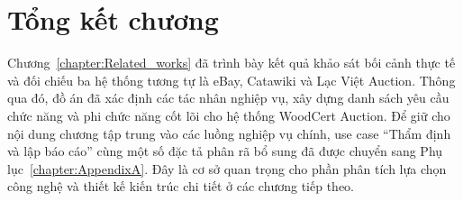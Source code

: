 \documentclass[../DoAn.tex]{subfiles}
\begin{document}
\section{Tổng kết chương}

Chương~\ref{chapter:Related_works} đã trình bày kết quả khảo sát bối cảnh thực tế và đối chiếu ba hệ thống tương tự là eBay, Catawiki và Lạc Việt Auction. Thông qua đó, đồ án đã xác định các tác nhân nghiệp vụ, xây dựng danh sách yêu cầu chức năng và phi chức năng cốt lõi cho hệ thống WoodCert Auction. Để giữ cho nội dung chương tập trung vào các luồng nghiệp vụ chính, use case ``Thẩm định và lập báo cáo'' cùng một số đặc tả phân rã bổ sung đã được chuyển sang Phụ lục~\ref{chapter:AppendixA}. Đây là cơ sở quan trọng cho phần phân tích lựa chọn công nghệ và thiết kế kiến trúc chi tiết ở các chương tiếp theo.

\FloatBarrier
\clearpage
\flushbottom
\end{document}

